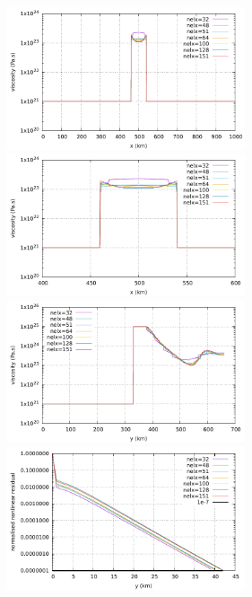 \begin{center}
\includegraphics[width=7cm]{python_codes/fieldstone_slab_detachment1/images/horizontal.pdf}
\includegraphics[width=7cm]{python_codes/fieldstone_slab_detachment1/images/horizontal_zoom.pdf}\\
\includegraphics[width=7cm]{python_codes/fieldstone_slab_detachment1/images/vertical.pdf}
\includegraphics[width=7cm]{python_codes/fieldstone_slab_detachment1/images/residual.pdf}
\end{center}

